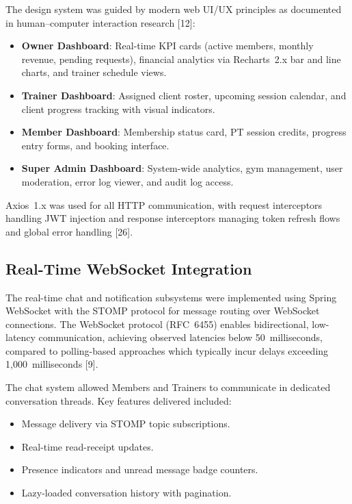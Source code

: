 \documentclass[
  12pt,
  a4paperpaper,
]{report}
\providecommand{\tightlist}{%
  \setlength{\itemsep}{0pt}\setlength{\parskip}{0pt}}
\begin{document}
The design system was guided by modern web UI/UX principles as
documented in human--computer interaction research {[}12{]}:

\begin{itemize}
\tightlist
\item \textbf{Owner Dashboard}: Real-time KPI cards (active members,
  monthly revenue, pending requests), financial analytics via
  Recharts~2.x bar and line charts, and trainer schedule views.
\item \textbf{Trainer Dashboard}: Assigned client roster, upcoming
  session calendar, and client progress tracking with visual
  indicators.
\item \textbf{Member Dashboard}: Membership status card, PT session
  credits, progress entry forms, and booking interface.
\item \textbf{Super Admin Dashboard}: System-wide analytics, gym
  management, user moderation, error log viewer, and audit log
  access.
\end{itemize}

Axios~1.x was used for all HTTP communication, with request
interceptors handling JWT injection and response interceptors
managing token refresh flows and global error handling {[}26{]}.

\subsection{Real-Time WebSocket
Integration}\label{realtime-websocket}

The real-time chat and notification subsystems were implemented using
Spring WebSocket with the STOMP protocol for message routing over
WebSocket connections. The WebSocket protocol (RFC~6455) enables
bidirectional, low-latency communication, achieving observed
latencies below 50~milliseconds, compared to polling-based
approaches which typically incur delays exceeding 1,000~milliseconds
{[}9{]}.

The chat system allowed Members and Trainers to communicate in de\-di\-ca\-ted
conversation threads. Key features delivered included:

\begin{itemize}
\tightlist
\item Message delivery via STOMP topic subscriptions.
\item Real-time read-receipt updates.
\item Presence indicators and unread message badge counters.
\item Lazy-loaded conversation history with pagination.
\end{itemize}
\end{document}
